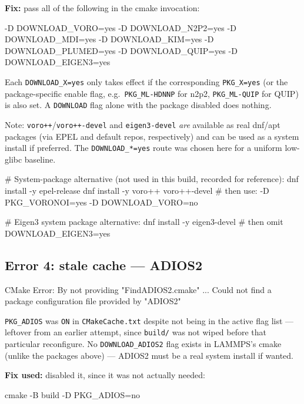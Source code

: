 \documentclass[11pt]{article}
\begin{document}
\textbf{Fix:} pass all of the following in the cmake invocation:
\begin{codebox}[]
-D DOWNLOAD_VORO=yes
-D DOWNLOAD_N2P2=yes
-D DOWNLOAD_MDI=yes
-D DOWNLOAD_KIM=yes
-D DOWNLOAD_PLUMED=yes
-D DOWNLOAD_QUIP=yes
-D DOWNLOAD_EIGEN3=yes
\end{codebox}

Each \texttt{DOWNLOAD\_X=yes} only takes effect if the corresponding
\texttt{PKG\_X=yes} (or the package-specific enable flag, e.g.\
\texttt{PKG\_ML-HDNNP} for n2p2, \texttt{PKG\_ML-QUIP} for QUIP) is also set.
A \texttt{DOWNLOAD} flag alone with the package disabled does nothing.

Note: \texttt{voro++}/\texttt{voro++-devel} and \texttt{eigen3-devel}
\emph{are} available as real dnf/apt packages (via EPEL and default repos,
respectively) and can be used as a system install if preferred.  The
\texttt{DOWNLOAD\_*=yes} route was chosen here for a uniform low-glibc baseline.

\begin{codebox}
\# System-package alternative (not used in this build, recorded for reference):
dnf install -y epel-release
dnf install -y voro++ voro++-devel
# then use: -D PKG_VORONOI=yes -D DOWNLOAD_VORO=no

# Eigen3 system package alternative:
dnf install -y eigen3-devel
# then omit DOWNLOAD_EIGEN3=yes
\end{codebox}

\subsection{Error 4: stale cache --- ADIOS2}

\begin{codebox}[]
CMake Error: By not providing "FindADIOS2.cmake" ...
  Could not find a package configuration file provided by "ADIOS2"
\end{codebox}

\texttt{PKG\_ADIOS} was \texttt{ON} in \texttt{CMakeCache.txt} despite not
being in the active flag list --- leftover from an earlier attempt, since
\texttt{build/} was not wiped before that particular reconfigure.  No
\texttt{DOWNLOAD\_ADIOS2} flag exists in LAMMPS's cmake (unlike the packages
above) --- ADIOS2 must be a real system install if wanted.

\textbf{Fix used:} disabled it, since it was not actually needed:

\begin{codebox}
cmake -B build -D PKG_ADIOS=no
\end{codebox}
\end{document}
